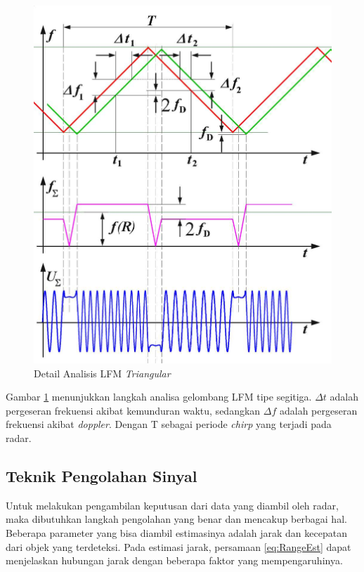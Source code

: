 \begin{figure}
	\begin{center}
		\includegraphics[scale=0.26]{pics/bab2/DetailMod.jpg}
		\caption[Detail Analisa LFM \textit{Triangular}]{Detail Analisis LFM \textit{Triangular}}
		\label{pic:DetailMod}
	\end{center}
\end{figure}

Gambar \ref{pic:DetailMod} menunjukkan langkah analisa gelombang LFM tipe segitiga. $\Delta t$ adalah pergeseran frekuensi akibat kemunduran waktu, sedangkan $\Delta f$ adalah pergeseran frekuensi akibat \textit{doppler}. Dengan T sebagai periode \textit{chirp} yang terjadi pada radar.

\subsection{Teknik Pengolahan Sinyal}
Untuk melakukan pengambilan keputusan dari data yang diambil oleh radar, maka dibutuhkan langkah pengolahan yang benar dan mencakup berbagai hal. Beberapa parameter yang bisa diambil estimasinya adalah jarak dan kecepatan dari objek yang terdeteksi. Pada estimasi jarak, persamaan \ref{eq:RangeEst} dapat menjelaskan hubungan jarak dengan beberapa faktor yang mempengaruhinya.

